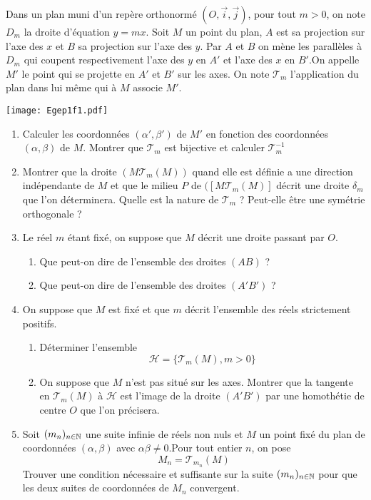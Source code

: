 Dans un plan muni d'un rep{\`e}re orthonorm{\'e}
$(O,\overrightarrow{i},\overrightarrow{j})$, pour tout $m>0$, on
note $D_m$ la droite d'{\'e}quation $y=mx$. Soit $M$ un point du plan,
$A$ est sa projection sur l'axe des $x$ et $B$ sa projection sur
l'axe des $y$. Par $A$ et $B$ on m{\`e}ne les parall{\`e}les {\`a} $D_m$ qui
coupent respectivement l'axe des $y$ en $A'$ et l'axe des $x$ en
$B'$.On appelle $M'$ le point qui se projette en $A'$ et $B'$ sur
les axes. On note $\mathcal{T}_m$ l'application du plan dans lui
m{\^e}me qui {\`a} $M$ associe $M'$.
\begin{center}
\texttt{[image: Egep1f1.pdf]}
\end{center}
\begin{enumerate}
  \item Calculer les coordonn{\'e}es $(\alpha ',\beta ')$ de $M'$ en
  fonction des coordonn{\'e}es $(\alpha,\beta)$ de $M$. Montrer que
  $\mathcal{T}_m$ est bijective et calculer $\mathcal{T}_m ^{-1}$
  \item Montrer que la droite $(M\mathcal{T}_m(M))$ quand elle est
  d{\'e}finie a une direction ind{\'e}pendante de $M$ et que le milieu $P$
  de $([M\mathcal{T}_m(M)]$ d{\'e}crit une droite $\delta_m$ que l'on
  d{\'e}terminera. Quelle est la nature de $\mathcal{T}_m$ ? Peut-elle
  {\^e}tre une sym{\'e}trie orthogonale ?
  \item Le r{\'e}el $m$ {\'e}tant fix{\'e}, on suppose que $M$ d{\'e}crit une
  droite passant par $O$.
    \begin{enumerate}
      \item Que peut-on dire de l'ensemble des droites $(AB)$ ?
      \item Que peut-on dire de l'ensemble des droites $(A'B')$ ?
    \end{enumerate}

  \item On suppose que $M$ est fix{\'e} et que $m$ d{\'e}crit l'ensemble
  des r{\'e}els strictement positifs.
    \begin{enumerate}
      \item D{\'e}terminer l'ensemble
      \[\mathcal{H}=\{\mathcal{T}_m(M), m>0\}\]
      \item On suppose que $M$ n'est pas situ{\'e} sur les axes.
      Montrer que la tangente en $\mathcal{T}_m(M)$ {\`a}
      $\mathcal{H}$ est l'image de la droite $(A'B')$ par une
      homoth{\'e}tie de centre $O$ que l'on pr{\'e}cisera.
    \end{enumerate}

  \item Soit $(m_n)_{n\in \Bbb{N}}$ une suite infinie de r{\'e}els non
  nuls et $M$ un point fix{\'e} du plan de coordonn{\'e}es $(\alpha,\beta)$ avec $\alpha \beta \neq
  0$.Pour tout entier $n$, on pose
  \[M_n=\mathcal{T}_{m_n}(M)\]
  Trouver une condition n{\'e}cessaire et suffisante sur la suite $(m_n)_{n\in
  \Bbb{N}}$ pour que les deux suites de coordonn{\'e}es de $M_n$
  convergent.
\end{enumerate}
